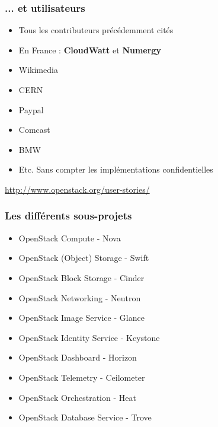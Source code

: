   \begin{frame}
    \frametitle{... et utilisateurs}
    \begin{itemize}
      \item Tous les contributeurs précédemment cités\pause
      \item En France : \textbf{CloudWatt} et \textbf{Numergy}\pause
      \item Wikimedia
      \item CERN
      \item Paypal
      \item Comcast
      \item BMW\pause
      \item Etc. Sans compter les implémentations confidentielles
    \end{itemize}
    \url{http://www.openstack.org/user-stories/}
  \end{frame}

  \begin{frame}
    \frametitle{Les différents sous-projets}
    \begin{itemize}
        \item OpenStack Compute - Nova
        \item OpenStack (Object) Storage - Swift\pause
        \item OpenStack Block Storage - Cinder\pause
        \item OpenStack Networking - Neutron\pause
        \item OpenStack Image Service - Glance\pause
        \item OpenStack Identity Service - Keystone\pause
        \item OpenStack Dashboard - Horizon\pause
        \item OpenStack Telemetry - Ceilometer\pause
        \item OpenStack Orchestration - Heat\pause
        \item OpenStack Database Service - Trove
    \end{itemize}
  \end{frame}

